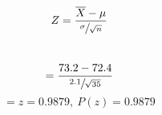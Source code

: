 \[ Z=\frac{\overline{X}-\mu}{\sfrac{\sigma}{\sqrt{n}}} \]\\
    \[ =\frac{73.2-72.4}{\sfrac{2.1}{\sqrt{35}}} \]
    \[ =z=0.9879, \ P(z)=0.9879 \]
